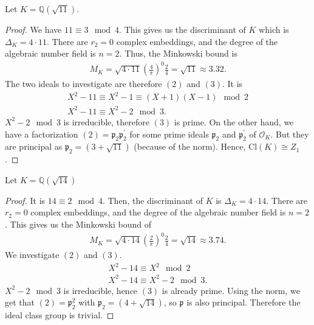 \begin{exmbox}
    \begin{example}
        Let \(K = \mathbb{Q}(\sqrt{11})\).
    \end{example}
\end{exmbox}
\begin{proof}
    We have \(11 \equiv 3 \mod{4}\). This gives us the discriminant of \(K\) which is \(\Delta_K = 4 \cdot 11\). There are \(r_2 = 0\) complex embeddings, and the degree of the algebraic number field is \(n = 2\). Thus, the Minkowski bound is
    \begin{align*}
        M_K = \sqrt{4 \cdot 11} \left(\frac{4}{\pi}\right)^0 \frac{2}{4} = \sqrt{11} \approx 3.32 \text{.}
    \end{align*}
    The two ideals to investigate are therefore \((2)\) and \((3)\). It is
    \begin{align*}
        X^2 - 11 \equiv X^2 - 1 \equiv (X + 1)(X - 1) \mod{2} \\
        X^2 - 11 \equiv X^2 - 2 \mod{3} \text{.}
    \end{align*}
    \(X^2 - 2 \mod{3}\) is irreducible, therefore \((3)\) is prime. On the other hand, we have a factorization \((2) = \mathfrak{p}_2 \mathfrak{p}_2^\prime\) for some prime ideals \(\mathfrak{p}_2\) and \(\mathfrak{p}_2^\prime\) of \(\mathcal{O}_K\). But they are principal as \(\mathfrak{p}_2 = (3 + \sqrt{11})\) (because of the norm). Hence, \(\mathrm{Cl}(K) \cong Z_1\).
\end{proof}

\begin{exmbox}
    \begin{example}
        Let \(K = \mathbb{Q}(\sqrt{14})\)
    \end{example}
\end{exmbox}
\begin{proof}
    It is \(14 \equiv 2 \mod{4}\). Then, the discriminant of \(K\) is \(\Delta_K = 4 \cdot 14\). There are \(r_2 = 0\) complex embeddings, and the degree of the algebraic number field is \(n = 2\). This gives us the Minkowski bound of
    \begin{align*}
        M_K = \sqrt{4 \cdot 14} \left(\frac{2}{\pi}\right)^0 \frac{2}{4} = \sqrt{14} \approx 3.74 \text{.}
    \end{align*}
    We investigate \((2)\) and \((3)\).
    \begin{align*}
        X^2 - 14 \equiv X^2 \mod{2} \\
        X^2 - 14 \equiv X^2 - 2 \mod{3} \text{.}
    \end{align*}
    \(X^2 - 2 \mod{3}\) is irreducible, hence \((3)\) is already prime. Using the norm, we get that \((2) = \mathfrak{p}_2^2\) with \(\mathfrak{p}_2 = (4 + \sqrt{14})\), so \(\mathfrak{p}\) is also principal. Therefore the ideal class group is trivial. 
\end{proof}













